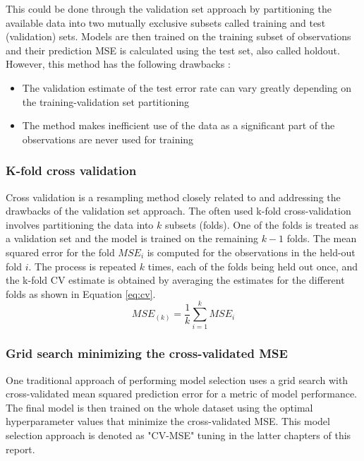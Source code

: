 This could be done through the validation set approach by partitioning the available data into two mutually exclusive subsets called training and test (validation) sets. Models are then trained on the training subset of observations and their prediction MSE is calculated using the test set, also called holdout. However, this method has the following drawbacks \cite{james2013introduction}:
\begin{itemize}
	\item The validation estimate of the test error rate can vary greatly depending on the training-validation set partitioning
	\item The method makes inefficient use of the data as a significant part of the observations are never used for training
\end{itemize} 

\subsubsection{K-fold cross validation}
Cross validation \cite{james2013introduction, kohavi1995study} is a resampling method closely related to and addressing the drawbacks of the validation set approach. The often used k-fold cross-validation involves partitioning the data into $k$ subsets (folds). One of the folds is treated as a validation set and the model is trained on the remaining $k-1$ folds. The mean squared error for the fold $MSE_i$ is computed for the observations in the held-out fold $i$. The process is repeated $k$ times, each of the folds being held out once, and the k-fold CV estimate is obtained by averaging the estimates for the different folds as shown in Equation \ref{eq:cv}.
\begin{equation} \label{eq:cv}
MSE_{(k)} = \frac{1}{k} \sum_{i=1}^{k} MSE_i
\end{equation}

\subsubsection{Grid search minimizing the cross-validated MSE}
One traditional approach of performing model selection uses a grid search with cross-validated mean squared prediction error for a metric of model performance. The final model is then trained on the whole dataset using the optimal hyperparameter values that minimize the cross-validated MSE. This model selection approach is denoted as "CV-MSE" tuning in the latter chapters of this report.

